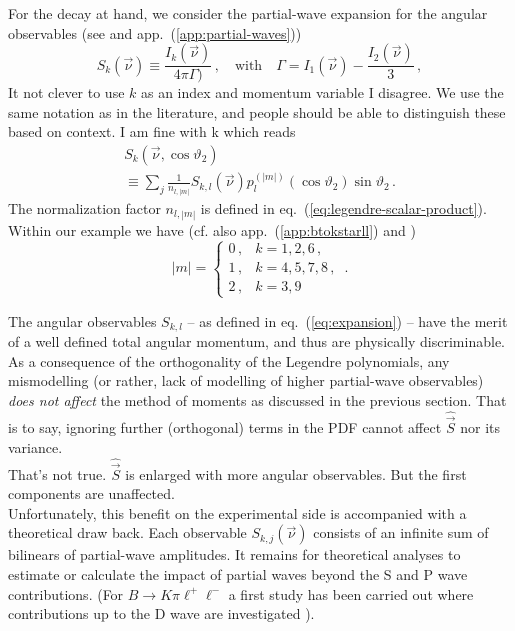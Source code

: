 \documentclass[aps,nofootinbib,preprintnumbers,prd,twocolumn]{revtex4-1}
\newcommand{\nuvec}{\vec{\nu}}
\newcommand{\refapp}[1]{app.~(\ref{app:#1})}
\newcommand{\refeq}[1]{eq.~(\ref{eq:#1})}
\renewcommand{\theta}{\vartheta}
\newcommand{\vecest}[1]{\widehat{\vec{#1}}}
\newcommand{\danny}[1]{{\color{purple}#1}}
\newcommand{\fred}[1]{{\color{brown!85!black}#1}}
\newcommand{\marcin}[1]{{\color{cyan}#1}}
\begin{document}
For the decay at hand, we consider the partial-wave expansion for the angular observables (see \cite{Lee:1992ih} and \refapp{partial-waves})
\begin{equation}
    S_k(\vec{\nu}) \equiv \frac{I_k(\nuvec)}{4\pi \Gamma)}\,,\quad\text{with}\quad \Gamma = I_1(\nuvec) - \frac{I_2(\nuvec)}{3}\,,
\end{equation}
\fred{It not clever to use $k$ as an index and momentum variable}
\danny{I disagree. We use the same notation as in the literature, and people
should be able to distinguish these based on context.} \marcin{I am fine with k}
which reads
\begin{multline}
    \label{eq:expansion}
    S_{k}(\vec{\nu},\cos\theta_2) \\
        \equiv \sum_{j} \frac{1}{n_{l,|m|}} S_{k,l}(\vec{\nu}) p_{l}^{(|m|)}(\cos\theta_2)\sin\theta_2\,.
\end{multline}
The normalization factor $n_{l,|m|}$ is defined in \refeq{legendre-scalar-product}. Within our
example we have (cf. also \refapp{btokstarll} and \cite{Lee:1992ih})
\begin{equation}
    |m| = \begin{cases}
        0\,, & k = 1,2,6\,,\\
        1\,, & k = 4,5,7,8\,,\\
        2\,, & k = 3,9
    \end{cases}\,.
\end{equation}

The angular observables $S_{k,l}$ -- as defined in \refeq{expansion} --
have the merit of a well defined total angular momentum, and thus are physically discriminable.
As a consequence of the orthogonality of the Legendre polynomials, any mismodelling (or rather, lack of modelling of higher
partial-wave observables) \emph{does not affect} the method of moments as discussed in the previous section. That is to say,
ignoring further (orthogonal) terms in the PDF cannot affect $\vecest{S}$ nor its variance.\\
\fred{That's not true. $\vecest{S}$ is enlarged with more angular observables. But the first components are unaffected.}\\

Unfortunately, this benefit on the experimental side is accompanied with a theoretical draw back. Each observable
$S_{k,j}(\vec{\nu})$ consists of an infinite sum of bilinears of partial-wave amplitudes. It remains for theoretical
analyses to estimate or calculate the impact of partial waves beyond the S and P wave contributions.
(For $B\to K\pi\ell^+\ell^-$ a first study has been carried out where contributions up to the D wave are investigated \cite{Das:2014sra}).\\
\end{document}
